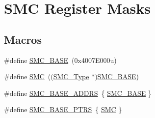 \hypertarget{group___s_m_c___register___masks}{}\section{S\+MC Register Masks}
\label{group___s_m_c___register___masks}
\subsection*{Macros}
\begin{DoxyCompactItemize}
\item 
\#define \mbox{\hyperlink{group___s_m_c___register___masks_ga683c9b3b5d9d94fb1ac7c4c18f5aff44}{S\+M\+C\+\_\+\+B\+A\+SE}}~(0x4007\+E000u)
\item 
\#define \mbox{\hyperlink{group___s_m_c___register___masks_ga6667e81e5b32250febd3d46511d9309d}{S\+MC}}~((\mbox{\hyperlink{struct_s_m_c___type}{S\+M\+C\+\_\+\+Type}} $\ast$)\mbox{\hyperlink{group___s_m_c___register___masks_ga683c9b3b5d9d94fb1ac7c4c18f5aff44}{S\+M\+C\+\_\+\+B\+A\+SE}})
\item 
\#define \mbox{\hyperlink{group___s_m_c___register___masks_ga1378b926401c2f7a44f4238a027ff8c2}{S\+M\+C\+\_\+\+B\+A\+S\+E\+\_\+\+A\+D\+D\+RS}}~\{ \mbox{\hyperlink{group___s_m_c___register___masks_ga683c9b3b5d9d94fb1ac7c4c18f5aff44}{S\+M\+C\+\_\+\+B\+A\+SE}} \}
\item 
\#define \mbox{\hyperlink{group___s_m_c___register___masks_gae583f3f0917ee513adcac36dd042a5f3}{S\+M\+C\+\_\+\+B\+A\+S\+E\+\_\+\+P\+T\+RS}}~\{ \mbox{\hyperlink{group___s_m_c___register___masks_ga6667e81e5b32250febd3d46511d9309d}{S\+MC}} \}
\end{DoxyCompactItemize}
